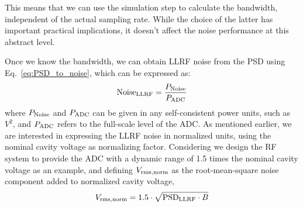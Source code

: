 \documentclass[a4paper,12pt]{article}
\begin{document}
This means that we can use the simulation step to calculate the bandwidth, independent of the actual sampling rate.  While the choice of the latter has important practical implications, it doesn't affect the noise performance at this abstract level.

Once we know the bandwidth, we can obtain LLRF noise from the PSD using Eq.~\eqref{eq:PSD_to_noise}, which can be expressed as:
\begin{equation}
  \centering {\rm Noise}_{\rm LLRF} = \frac{P_{\rm Noise}}{P_{\rm ADC}}
  \label{eq:dBc_def}
\end{equation}
where $P_{\rm Noise}$ and $P_{\rm ADC}$ can be given in any self-consistent power units, such as $V^2$,
and $P_{\rm ADC}$ refers to the full-scale level of the \hbox{ADC}.
As mentioned earlier, we are interested in expressing the LLRF noise in normalized units, using the nominal cavity voltage as normalizing factor. Considering we design the RF system to provide the ADC with a dynamic range of 1.5 times the nominal cavity voltage as an example, 
and defining $V_{\rm rms,norm}$ as the root-mean-square noise component added to
normalized cavity voltage,
\begin{equation}
  \centering V_{\rm rms,norm} = 1.5 \cdot \sqrt{{\rm PSD}_{\rm LLRF} \cdot B}
  \label{eq:v_noise_final}
\end{equation}
\end{document}
